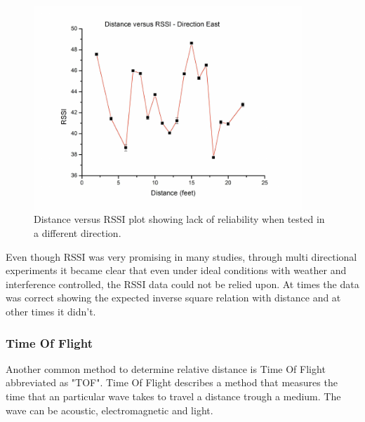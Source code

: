 \documentclass[10pt,a4paper]{article}
\begin{document}
\begin{figure}[H]
\centering
\includegraphics[width=0.9\textwidth]{East.pdf}
\caption{Distance versus RSSI plot showing lack of
reliability when tested in a different direction.\cite{RSSI}} 
\label{East}
\end{figure}
\newpage


Even though RSSI was very promising in many studies, through multi directional experiments it became clear that even under ideal conditions with weather and interference controlled, the RSSI data could not be relied upon. At times the data was correct showing the expected inverse square relation with distance and at other times it didn't.\cite{RSSI}


\subsubsection{Time Of Flight}
Another common method to determine relative distance is Time Of Flight abbreviated as "TOF". Time Of Flight describes a method that measures the time that an particular wave takes to travel a distance trough a medium. The wave can be acoustic, electromagnetic and light.
\end{document}
